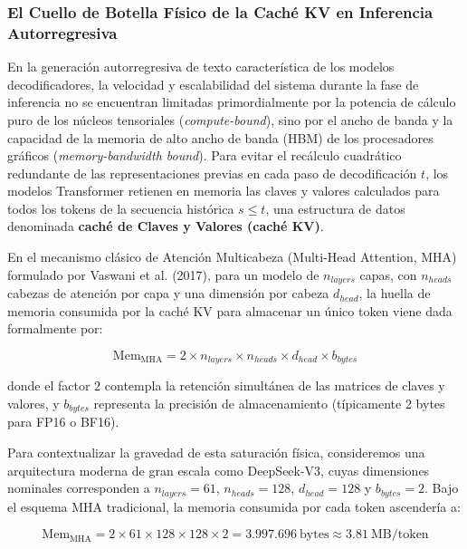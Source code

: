 \subsubsection{El Cuello de Botella Físico de la Caché KV en Inferencia Autorregresiva}

En la generación autorregresiva de texto característica de los modelos decodificadores, la velocidad y escalabilidad del sistema durante la fase de inferencia no se encuentran limitadas primordialmente por la potencia de cálculo puro de los núcleos tensoriales (\textit{compute-bound}), sino por el ancho de banda y la capacidad de la memoria de alto ancho de banda (HBM) de los procesadores gráficos (\textit{memory-bandwidth bound}). Para evitar el recálculo cuadrático redundante de las representaciones previas en cada paso de decodificación $t$, los modelos Transformer retienen en memoria las claves y valores calculados para todos los tokens de la secuencia histórica $s \le t$, una estructura de datos denominada \textbf{caché de Claves y Valores (caché KV)}.

En el mecanismo clásico de Atención Multicabeza (Multi-Head Attention, MHA) formulado por Vaswani et al. (2017), para un modelo de $n_{layers}$ capas, con $n_{heads}$ cabezas de atención por capa y una dimensión por cabeza $d_{head}$, la huella de memoria consumida por la caché KV para almacenar un único token viene dada formalmente por:

\begin{equation}
\mathrm{Mem}_{\mathrm{MHA}} = 2 \times n_{layers} \times n_{heads} \times d_{head} \times b_{bytes}
\end{equation}

donde el factor $2$ contempla la retención simultánea de las matrices de claves y valores, y $b_{bytes}$ representa la precisión de almacenamiento (típicamente 2 bytes para FP16 o BF16). 

Para contextualizar la gravedad de esta saturación física, consideremos una arquitectura moderna de gran escala como DeepSeek-V3, cuyas dimensiones nominales corresponden a $n_{layers} = 61$, $n_{heads} = 128$, $d_{head} = 128$ y $b_{bytes} = 2$. Bajo el esquema MHA tradicional, la memoria consumida por cada token ascendería a:

\begin{equation}
\mathrm{Mem}_{\mathrm{MHA}} = 2 \times 61 \times 128 \times 128 \times 2 = 3.997.696\ \mathrm{bytes} \approx 3.81\ \mathrm{MB/token}
\end{equation}

